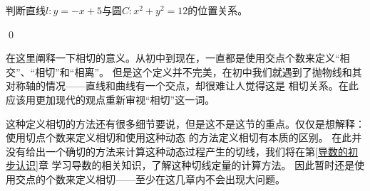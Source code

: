 \begin{example}
    判断直线\(l:y=-x+5\)与圆\(C:x^2+y^2=12\)的位置关系。
\end{example}
\begin{exercise}
    
\end{exercise}
\begin{jie}
    
    \qed
\end{jie}

在这里阐释一下相切的意义。从初中到现在，一直都是使用交点个数来定义“相交”、“相切”和“相离”。
但是这个定义并不完美，在初中我们就遇到了抛物线和其对称轴的情况——直线和曲线有一个交点，却很难让人觉得这是
相切关系。在此应该用更加现代的观点重新审视“相切”这一词。







这种定义相切的方法还有很多细节要说，但是这不是这节的重点。仅仅是想解释：使用切点个数来定义相切和使用这种动态
的方法定义相切有本质的区别。
在此并没有给出一个确切的方法来计算这种动态过程产生的切线，我们将在第\ref{导数的初步认识}章
学习导数的相关知识，了解这种切线定量的计算方法。
因此暂时还是使用交点的个数来定义相切——至少在这几章内不会出现大问题。




